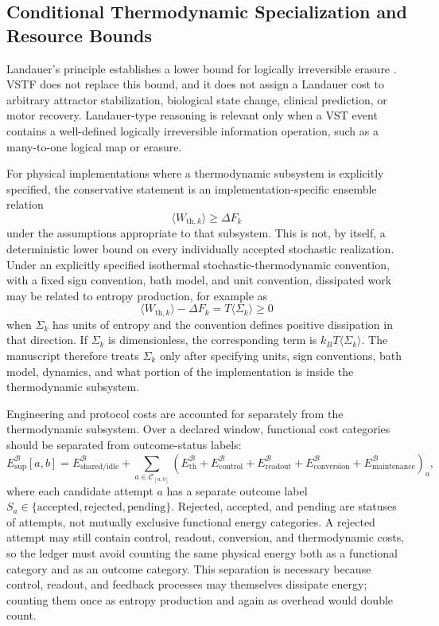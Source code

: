 \documentclass[11pt,a4paper]{article}
\newcommand{\1}{\mathbf{1}}
\begin{document}
\subsection{Conditional Thermodynamic Specialization and Resource Bounds}

Landauer's principle establishes a lower bound for logically irreversible erasure \cite{landauer1961,bennett2003,berut2012}. VSTF does not replace this bound, and it does not assign a Landauer cost to arbitrary attractor stabilization, biological state change, clinical prediction, or motor recovery. Landauer-type reasoning is relevant only when a VST event contains a well-defined logically irreversible information operation, such as a many-to-one logical map or erasure.

For physical implementations where a thermodynamic subsystem is explicitly specified, the conservative statement is an implementation-specific ensemble relation
\[
  \langle W_{\mathrm{th},k}\rangle \geq \Delta F_k
\]
under the assumptions appropriate to that subsystem. This is not, by itself, a deterministic lower bound on every individually accepted stochastic realization. Under an explicitly specified isothermal stochastic-thermodynamic convention, with a fixed sign convention, bath model, and unit convention, dissipated work may be related to entropy production, for example as
\[
  \langle W_{\mathrm{th},k}\rangle-\Delta F_k
  =
  T\langle\Sigma_k\rangle
  \geq 0
\]
when $\Sigma_k$ has units of entropy and the convention defines positive dissipation in that direction. If $\Sigma_k$ is dimensionless, the corresponding term is $k_B T\langle\Sigma_k\rangle$. The manuscript therefore treats $\Sigma_k$ only after specifying units, sign conventions, bath model, dynamics, and what portion of the implementation is inside the thermodynamic subsystem.

Engineering and protocol costs are accounted for separately from the thermodynamic subsystem. Over a declared window, functional cost categories should be separated from outcome-status labels:
\[
  E_{\mathrm{sup}}^{\mathcal{B}}[a,b]
  =
  E_{\mathrm{shared/idle}}^{\mathcal{B}}
  +
  \sum_{a\in\mathcal{C}_{[a,b]}}
  \left(
  E_{\mathrm{th}}^{\mathcal{B}}
  +E_{\mathrm{control}}^{\mathcal{B}}
  +E_{\mathrm{readout}}^{\mathcal{B}}
  +E_{\mathrm{conversion}}^{\mathcal{B}}
  +E_{\mathrm{maintenance}}^{\mathcal{B}}
  \right)_a,
\]
where each candidate attempt $a$ has a separate outcome label $S_a\in\{\mathrm{accepted},\mathrm{rejected},\mathrm{pending}\}$. Rejected, accepted, and pending are statuses of attempts, not mutually exclusive functional energy categories. A rejected attempt may still contain control, readout, conversion, and thermodynamic costs, so the ledger must avoid counting the same physical energy both as a functional category and as an outcome category. This separation is necessary because control, readout, and feedback processes may themselves dissipate energy; counting them once as entropy production and again as overhead would double count.
\end{document}
